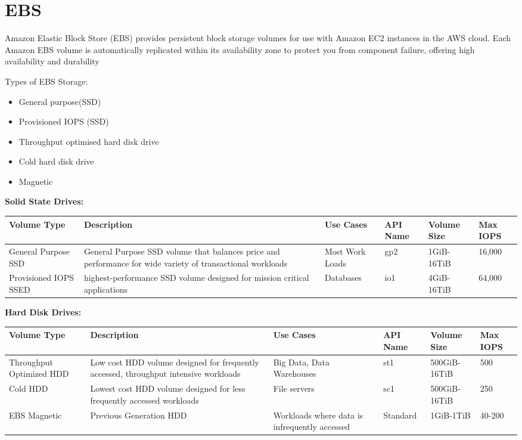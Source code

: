 \documentclass{article}
\begin{document}
\section{EBS}
Amazon Elastic Block Store (EBS) provides persistent block storage volumes for use with Amazon EC2 instances in the AWS cloud. Each Amazon EBS volume is automatically replicated within its availability zone to protect you from component failure, offering high availability and durability

Types of EBS Storage:
\begin{itemize}
\item
General purpose(SSD)

\item
Provisioned IOPS (SSD)

\item
Throughput optimised hard disk drive

\item
Cold hard disk drive

\item
Magnetic
\end{itemize}
\textbf{Solid State Drives:} 
\begin{center}
		\begin{tabular}{ |p{1.7cm}|p{6cm}|p{2cm}|p{1.5cm}|p{1.5cm}|p{1.5cm}|}
		\hline
		\textbf{Volume Type} & \textbf{Description} & \textbf{Use Cases} & \textbf{API Name} & \textbf{Volume Size} & \textbf{Max IOPS} \\ 
		\hline
		General Purpose SSD & General Purpose SSD volume that balances price and performance for wide variety of transactional workloads & Most Work Loads & gp2 & 1GiB-16TiB & 16,000 \\ \hline
		Provisioned IOPS SSED & highest-performance SSD volume designed for mission critical applications & Databases & io1 & 4GiB-16TiB & 64,000 \\ \hline
		\end{tabular}
\end{center}


\textbf{Hard Disk Drives: }
\begin{center}
		\begin{tabular}{ |p{1.7cm}|p{6cm}|p{2cm}|p{1.5cm}|p{1.5cm}|p{1.5cm}|}
		\hline
		\textbf{Volume Type} & \textbf{Description} & \textbf{Use Cases} & \textbf{API Name} & \textbf{Volume Size} & \textbf{Max IOPS} \\ 
		\hline
		Throughput Optimized HDD & Low cost HDD volume designed for frequently accessed, throughput intensive workloads & Big Data, Data Warehouses & st1 & 500GiB-16TiB & 500 \\ \hline
		Cold HDD & Lowest cost HDD volume designed for less frequently accessed workloads & File servers & sc1 & 500GiB-16TiB & 250 \\ \hline
		EBS Magnetic & Previous Generation HDD & Workloads where data is infrequently accessed & Standard & 1GiB-1TiB & 40-200 \\ \hline
		\end{tabular}
\end{center}
\end{document}

